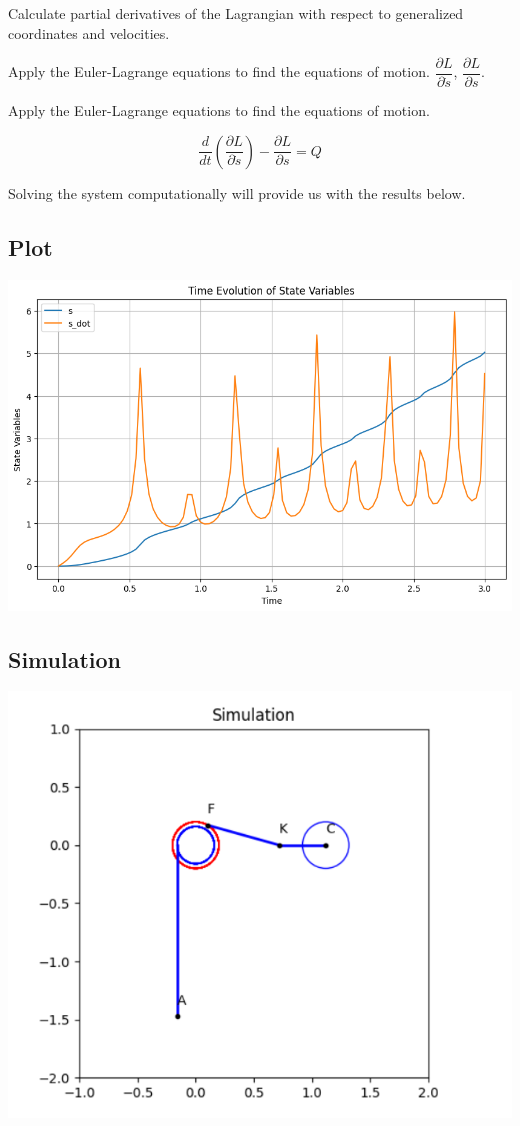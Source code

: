 \documentclass{article}
\begin{document}
Calculate partial derivatives of the Lagrangian with respect to generalized coordinates and velocities.

Apply the Euler-Lagrange equations to find the equations of motion.
$\dfrac{\partial L}{\partial \dot{s}}$, $\dfrac{\partial L}{\partial s}$.


Apply the Euler-Lagrange equations to find the equations of motion.


\[\frac{d}{dt} \left( \frac{\partial L}{\partial \dot{s}} \right) - \frac{\partial L}{\partial s} = Q\]

Solving the system computationally will provide us with the results below.

\subsection{Plot}

\includegraphics[scale=0.5]{plots.png}

\subsection{Simulation}

\includegraphics[scale=0.3]{hw8_simulation.png}{\centering}
\end{document}
